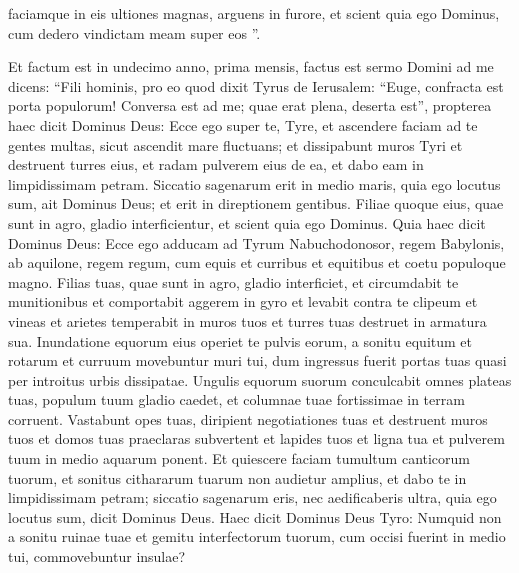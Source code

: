 \begin{biblechapter}
\begin{biblechapter}
\begin{biblechapter}
\begin{biblechapter}
\begin{biblechapter}
\begin{biblechapter}
\begin{biblechapter}
\begin{biblechapter}
\begin{biblechapter}
\begin{biblechapter}
\begin{biblechapter}
\begin{biblechapter}
\begin{biblechapter}
\begin{biblechapter}
\begin{biblechapter}
\begin{biblechapter}
\begin{biblechapter}
\begin{biblechapter}
\begin{biblechapter}
\begin{biblechapter}
\begin{biblechapter}
\begin{biblechapter}
\begin{biblechapter}
\begin{biblechapter}
\begin{biblechapter}
\verse faciamque in eis ultiones magnas, arguens in furore, et scient quia ego Dominus, cum dedero vindictam meam super eos ”.
 
\begin{biblechapter}
\verse Et factum est in undecimo anno, prima mensis, factus est sermo Domini ad me dicens: 
\verse “Fili hominis, pro eo quod dixit Tyrus de Ierusalem:
 “Euge, confracta est
 porta populorum!
 Conversa est ad me;
 quae erat plena, deserta est”,
 \verse propterea haec dicit Dominus Deus:
 Ecce ego super te, Tyre,
 et ascendere faciam ad te gentes multas,
 sicut ascendit mare fluctuans;
 \verse et dissipabunt muros Tyri
 et destruent turres eius,
 et radam pulverem eius de ea,
 et dabo eam in limpidissimam petram.
 \verse Siccatio sagenarum
 erit in medio maris,
 quia ego locutus sum,
 ait Dominus Deus;
 et erit in direptionem gentibus.
 \verse Filiae quoque eius, quae sunt in agro,
 gladio interficientur,
 et scient quia ego Dominus.
 \verse Quia haec dicit Dominus Deus:
 Ecce ego adducam ad Tyrum
 Nabuchodonosor, regem Babylonis,
 ab aquilone, regem regum,
 cum equis et curribus et equitibus
 et coetu populoque magno.
 \verse Filias tuas, quae sunt in agro,
 gladio interficiet,
 et circumdabit te munitionibus
 et comportabit aggerem in gyro
 et levabit contra te clipeum
 \verse et vineas et arietes temperabit in muros tuos
 et turres tuas destruet in armatura sua.
 \verse Inundatione equorum eius
 operiet te pulvis eorum,
 a sonitu equitum
 et rotarum et curruum
 movebuntur muri tui,
 dum ingressus fuerit portas tuas
 quasi per introitus urbis dissipatae.
 \verse Ungulis equorum suorum
 conculcabit omnes plateas tuas,
 populum tuum gladio caedet,
 et columnae tuae fortissimae
 in terram corruent.
 \verse Vastabunt opes tuas,
 diripient negotiationes tuas
 et destruent muros tuos
 et domos tuas praeclaras subvertent
 et lapides tuos et ligna tua et pulverem tuum
 in medio aquarum ponent.
 \verse Et quiescere faciam tumultum canticorum tuorum,
 et sonitus cithararum tuarum non audietur amplius,
 \verse et dabo te in limpidissimam petram;
 siccatio sagenarum eris,
 nec aedificaberis ultra,
 quia ego locutus sum,
 dicit Dominus Deus.
 \verse Haec dicit Dominus Deus Tyro: Numquid non a sonitu ruinae tuae et gemitu interfectorum tuorum, cum occisi fuerint in medio tui, commovebuntur insulae? 

\end{biblechapter}
\end{biblechapter}
\end{biblechapter}
\end{biblechapter}
\end{biblechapter}
\end{biblechapter}
\end{biblechapter}
\end{biblechapter}
\end{biblechapter}
\end{biblechapter}
\end{biblechapter}
\end{biblechapter}
\end{biblechapter}
\end{biblechapter}
\end{biblechapter}
\end{biblechapter}
\end{biblechapter}
\end{biblechapter}
\end{biblechapter}
\end{biblechapter}
\end{biblechapter}
\end{biblechapter}
\end{biblechapter}
\end{biblechapter}
\end{biblechapter}
\end{biblechapter}
